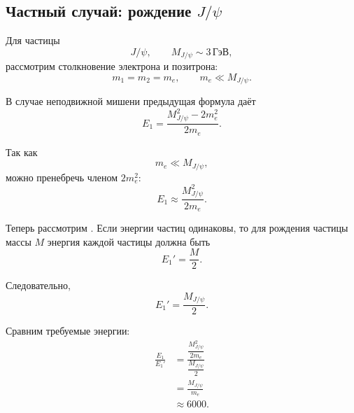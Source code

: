 \documentclass[../final.tex]{subfiles}
\begin{document}

\subsection*{Частный случай: рождение $J/\psi$}

Для частицы
%
\begin{equation*}
    J/\psi,
    \qquad
    M_{J/\psi}
    \sim
    3\,\text{ГэВ},
\end{equation*}
%
рассмотрим столкновение электрона и позитрона:
%
\begin{equation*}
    m_1=m_2=m_e,
    \qquad
    m_e\ll M_{J/\psi}.
\end{equation*}

В случае неподвижной мишени предыдущая формула даёт
%
\begin{equation*}
    E_1
    =
    \frac{
        M_{J/\psi}^2-2m_e^2
    }{
        2m_e
    }.
\end{equation*}

Так как
%
\begin{equation*}
    m_e\ll M_{J/\psi},
\end{equation*}
%
можно пренебречь членом $2m_e^2$:
%
\begin{equation*}
    E_1
    \approx
    \frac{
        M_{J/\psi}^2
    }{
        2m_e
    }.
\end{equation*}

Теперь рассмотрим .
Если энергии частиц одинаковы, то для рождения частицы массы $M$
энергия каждой частицы должна быть
%
\begin{equation*}
    E_1'
    =
    \frac{M}{2}.
\end{equation*}

Следовательно,
%
\begin{equation*}
    E_1'
    =
    \frac{
        M_{J/\psi}
    }{2}.
\end{equation*}

Сравним требуемые энергии:
%
\begin{align*}
    \frac{E_1}{E_1'}
    &=
    \frac{
        \dfrac{M_{J/\psi}^2}{2m_e}
    }{
        \dfrac{M_{J/\psi}}{2}
    }
    \\[4pt]
    &=
    \frac{
        M_{J/\psi}
    }{
        m_e
    }
    \\[4pt]
    &\approx
    6000.
\end{align*}
\end{document}
